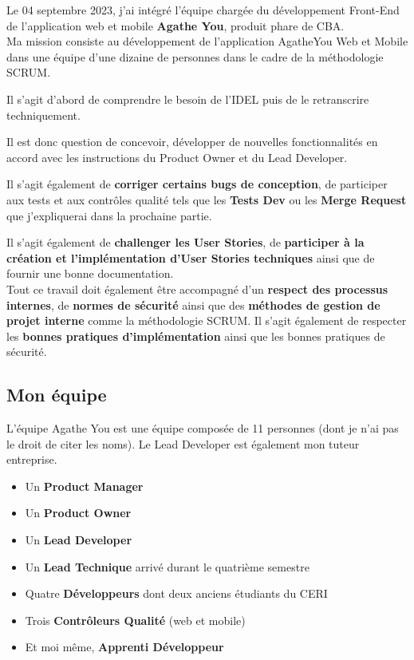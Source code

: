 \documentclass{article}
\begin{document}
Le 04 septembre 2023, j'ai intégré l'équipe chargée du développement Front-End de l'application web et mobile \textbf{Agathe You}, produit phare de CBA. \\

Ma mission consiste au développement de l'application AgatheYou Web et Mobile dans une équipe d'une dizaine de personnes dans le cadre de la méthodologie SCRUM.

Il s'agit d'abord de comprendre le besoin de l'IDEL puis de le retranscrire techniquement.

Il est donc question de concevoir, développer de nouvelles fonctionnalités en accord avec les instructions du Product Owner et du Lead Developer.

Il s'agit également de \textbf{corriger certains bugs de conception}, de participer aux tests et aux contrôles qualité tels que les \textbf{Tests Dev} ou les \textbf{Merge Request} que j'expliquerai dans la prochaine partie.

Il s'agit également de \textbf{challenger les User Stories}, de \textbf{participer à la création et l'implémentation d'User Stories techniques} ainsi que de fournir une bonne documentation.\\

Tout ce travail doit également être accompagné d'un \textbf{respect des processus internes}, de \textbf{normes de sécurité} ainsi que des \textbf{méthodes de gestion de projet interne} comme la méthodologie SCRUM. Il s'agit également de respecter les \textbf{bonnes pratiques d'implémentation} ainsi que les bonnes pratiques de sécurité.

\subsection{Mon équipe}
L'équipe Agathe You est une équipe composée de 11 personnes (dont je n'ai pas le droit de citer les noms). Le Lead Developer est également mon tuteur entreprise.

\begin{itemize}
    \item Un \textbf{Product Manager}
    \item Un \textbf{Product Owner}
    \item Un \textbf{Lead Developer}
    \item Un \textbf{Lead Technique} {arrivé durant le quatrième semestre}
    \item Quatre \textbf{Développeurs} dont deux anciens étudiants du CERI
    \item Trois \textbf{Contrôleurs Qualité} (web et mobile)
    \item Et moi même, \textbf{Apprenti Développeur}
\end{itemize}
\end{document}
